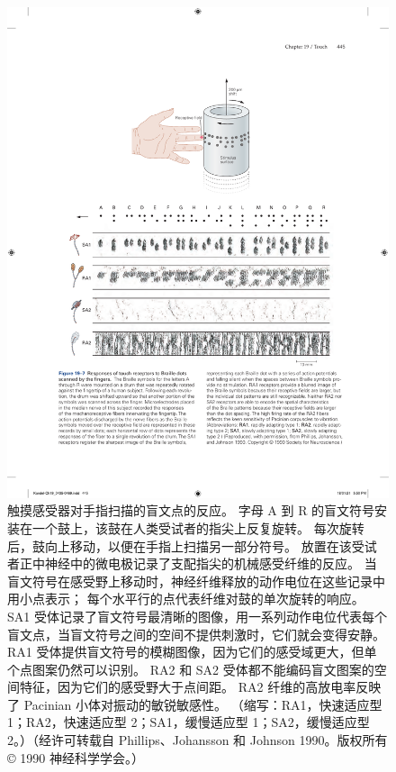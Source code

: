 \begin{figure}[htbp]
	\centering
	\includegraphics[width=1.0\linewidth]{chap19/fig_19_7}
	\caption{触摸感受器对手指扫描的盲文点的反应。 
		字母 A 到 R 的盲文符号安装在一个鼓上，该鼓在人类受试者的指尖上反复旋转。 
		每次旋转后，鼓向上移动，以便在手指上扫描另一部分符号。 
		放置在该受试者正中神经中的微电极记录了支配指尖的机械感受纤维的反应。 
		当盲文符号在感受野上移动时，神经纤维释放的动作电位在这些记录中用小点表示； 每个水平行的点代表纤维对鼓的单次旋转的响应。 
		SA1 受体记录了盲文符号最清晰的图像，用一系列动作电位代表每个盲文点，当盲文符号之间的空间不提供刺激时，它们就会变得安静。 
		RA1 受体提供盲文符号的模糊图像，因为它们的感受域更大，但单个点图案仍然可以识别。 
		RA2 和 SA2 受体都不能编码盲文图案的空间特征，因为它们的感受野大于点间距。 
		RA2 纤维的高放电率反映了 Pacinian 小体对振动的敏锐敏感性。 （缩写：RA1，快速适应型 1；RA2，快速适应型 2；SA1，缓慢适应型 1；SA2，缓慢适应型 2。）（经许可转载自 Phillips、Johansson 和 Johnson 1990。版权所有 © 1990 神经科学学会。）}
	\label{fig:19_7}
\end{figure}


